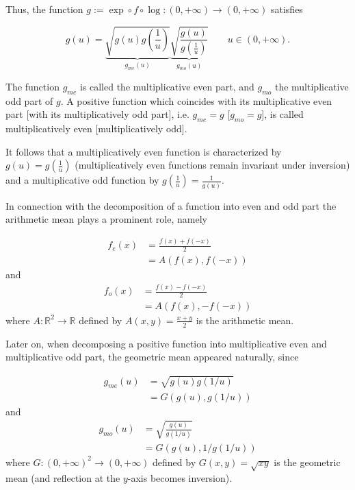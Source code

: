 \documentclass{amsart}
\theoremstyle{plain}
\numberwithin{equation}{section}
\newcommand{\R}{{\mathbb{R}}}
\begin{document}
Thus, the function $g:=\exp \circ f \circ \log: (0, + \infty) \to (0, + \infty)$ satisfies

\begin{equation*}
g(u)=
\underbrace{\sqrt{g(u)g\left( \frac{1}{u}\right)}}_{g_{me}(u)}
\underbrace{\sqrt{\frac{g(u)}{g\left( \frac{1}{u}\right)}}}_{g_{mo}(u)}
\qquad u \in (0, + \infty).
\end{equation*}

The function $g_{me}$ is called the multiplicative even part,
and $g_{mo}$ the multiplicative odd part of $g$.
A positive function which coincides with its multiplicative even part [with its multiplicatively odd part],
i.e. $g_{me}=g$ [$g_{mo}=g$], 
is called multiplicatively even [multiplicatively odd].

It follows that a multiplicatively even function is characterized by $g(u)=g(\frac{1}{u})$ (multiplicatively even functions remain invariant under inversion)
and a multiplicative odd function by $g(\frac{1}{u})=\frac{1}{g(u)}$.

In connection with the decomposition of a function into even and odd part the arithmetic mean plays a prominent role, namely

\begin{eqnarray*}
f_{e}(x)&=\frac{f(x)+f(-x)}{2}\\
&=A(f(x), f(-x))
\end{eqnarray*}
and
\begin{eqnarray*}
f_{o}(x)&=\frac{f(x)-f(-x)}{2}\\
&=A(f(x), -f(-x))
\end{eqnarray*}
where $A:\R^2 \to \R$ defined by $A(x,y)=\frac{x+y}{2}$ is the arithmetic mean.


Later on, 
when decomposing a positive function into multiplicative even and multiplicative odd part,
the geometric mean appeared naturally, since

\begin{eqnarray*}
g_{me}(u)&={\sqrt{g(u) g (1/u) }}\\
&=G(g(u), g\left(1/u\right) )
\end{eqnarray*}
and
\begin{eqnarray*}
g_{mo}(u)&={\sqrt{\frac{g(u)}{g\left( 1/u \right)}}}\\
&=G(g(u), 1/g(1/u))
\end{eqnarray*}
where $G:(0,+\infty)^2 \to (0,+\infty)$ defined by $G(x,y)=\sqrt{xy}$ is the geometric mean
(and reflection at the $y$-axis becomes inversion).
\end{document}
